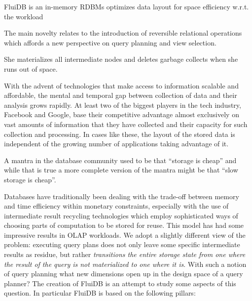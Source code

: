 
\begin{summary}
\item FluiDB is an in-memory RDBMs optimizes data layout for space
  efficiency w.r.t. the workload
\item The main novelty relates to the introduction of reversible
  relational operations which affords a new perspective on query
  planning and view selection.
\item She materializes all intermediate nodes and deletes garbage
  collects when she runs out of space.
\end{summary}

With the advent of technologies that make access to information
scalable and affordable, the mental and temporal gap between
collection of data and their analysis grows rapidly. At least two of
the biggest players in the tech industry, Facebook and Google,
base their competitive advantage almost exclusively on vast amounts of
information that they have collected and their capacity for such
collection and processing. In cases like these, the layout of the
stored data is independent of the growing number of applications
taking advantage of it.

A mantra in the database community used to be that ``storage is cheap''
and while that is true a more complete version of the mantra might be
that ``slow storage is cheap''.

Databases have traditionally been dealing with the trade-off between
memory and time efficiency within monetary constraints, especially with
the use of intermediate result recycling technologies which employ
sophisticated ways of choosing parts of computation to be stored for
reuse. This model has had some impressive results in OLAP
workloads. We adopt a slightly different view of the problem:
executing query plans does not only leave some specific intermediate
results as residue, but rather \emph{transitions the entire storage
  state from one where the result of the query is not materialized to
  one where it is}. With such a notion of query planning what new
dimensions open up in the design space of a query planner? The creation
of FluiDB is an attempt to study some aspects of this question. In
particular FluiDB is based on the following pillars:


